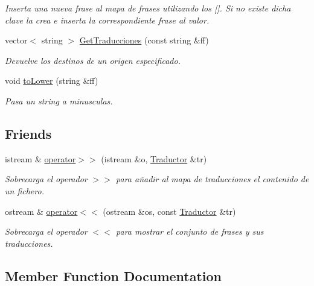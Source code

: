 \begin{DoxyCompactItemize}
\begin{DoxyCompactList}\small\item\em Inserta una nueva frase al mapa de frases utilizando los \mbox{[}\mbox{]}. Si no existe dicha clave la crea e inserta la correspondiente frase al valor. \end{DoxyCompactList}\item 
vector$<$ string $>$ \hyperlink{class_traductor_ad80103faf9d79807b3d1c6718ce7d14b}{Get\+Traducciones} (const string \&ff)
\begin{DoxyCompactList}\small\item\em Devuelve los destinos de un origen especificado. \end{DoxyCompactList}\item 
void \hyperlink{class_traductor_a746af8812dd1a75e66fece798d151a8c}{to\+Lower} (string \&ff)
\begin{DoxyCompactList}\small\item\em Pasa un string a minusculas. \end{DoxyCompactList}\end{DoxyCompactItemize}
\subsection*{Friends}
\begin{DoxyCompactItemize}
\item 
istream \& \hyperlink{class_traductor_a60ee2a06b6560b2edec8ad3fb223e903}{operator$>$$>$} (istream \&o, \hyperlink{class_traductor}{Traductor} \&tr)
\begin{DoxyCompactList}\small\item\em Sobrecarga el operador $>$$>$ para añadir al mapa de traducciones el contenido de un fichero. \end{DoxyCompactList}\item 
ostream \& \hyperlink{class_traductor_a78120f314da935ebbe07cf3e4f3b26d7}{operator$<$$<$} (ostream \&os, const \hyperlink{class_traductor}{Traductor} \&tr)
\begin{DoxyCompactList}\small\item\em Sobrecarga el operador $<$$<$ para mostrar el conjunto de frases y sus traducciones. \end{DoxyCompactList}\end{DoxyCompactItemize}


\subsection{Member Function Documentation}
